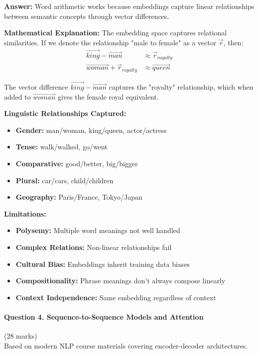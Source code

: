 \documentclass[12pt]{article}
\newcommand{\answer}[1]{{\color{answercolor}\textbf{Answer:} #1}}
\newcommand{\explanation}[1]{{\color{explanationcolor}#1}}
\begin{document}
\begin{enumerate}[(a)]
    \answer{Word arithmetic works because embeddings capture linear relationships between semantic concepts through vector differences.}
    
    \explanation{
    \textbf{Mathematical Explanation:}
    The embedding space captures relational similarities. If we denote the relationship "male to female" as a vector $\vec{r}$, then:
    \begin{align}
        \vec{king} - \vec{man} &\approx \vec{r}_{royalty} \\
        \vec{woman} + \vec{r}_{royalty} &\approx \vec{queen}
    \end{align}
    
    The vector difference $\vec{king} - \vec{man}$ captures the "royalty" relationship, which when added to $\vec{woman}$ gives the female royal equivalent.
    
    \textbf{Linguistic Relationships Captured:}
    \begin{itemize}
        \item \textbf{Gender:} man/woman, king/queen, actor/actress
        \item \textbf{Tense:} walk/walked, go/went
        \item \textbf{Comparative:} good/better, big/bigger
        \item \textbf{Plural:} car/cars, child/children
        \item \textbf{Geography:} Paris/France, Tokyo/Japan
    \end{itemize}
    
    \textbf{Limitations:}
    \begin{itemize}
        \item \textbf{Polysemy:} Multiple word meanings not well handled
        \item \textbf{Complex Relations:} Non-linear relationships fail
        \item \textbf{Cultural Bias:} Embeddings inherit training data biases
        \item \textbf{Compositionality:} Phrase meanings don't always compose linearly
        \item \textbf{Context Independence:} Same embedding regardless of context
    \end{itemize}
    }
\end{enumerate}

\newpage
\paragraph{Question 4. Sequence-to-Sequence Models and Attention}\hfill (28 marks)\\
Based on modern NLP course materials covering encoder-decoder architectures.
\end{document}

